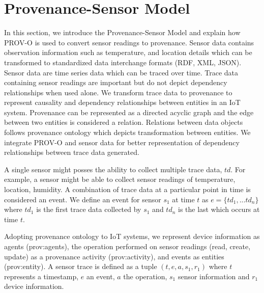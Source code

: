 \documentclass[conference]{IEEEtran}
\begin{document}



%



\section {Provenance-Sensor Model}
In this section, we introduce the Provenance-Sensor Model and explain how PROV-O is used to convert sensor readings to provenance. Sensor data contains observation information such as temperature, and location details which can be transformed to standardized data interchange formats (RDF, XML, JSON). Sensor data are time series data which can be traced over time. Trace data containing sensor readings are important but do not depict dependency relationships when used alone. We transform trace data to provenance to represent causality and dependency relationships between entities in an IoT system. Provenance can be represented as a directed acyclic graph and the edge between two entities is considered a relation. Relations between data objects follows provenance ontology which depicts transformation between entities. We integrate PROV-O and sensor data for better representation of dependency relationships between trace data generated.

\par A single sensor might posses the ability to collect multiple trace data, $td$. For example, a sensor might be able to collect sensor readings of temperature, location, humidity. A combination of trace data at a particular point in time is considered an event. We define an event  for sensor $s_1$ at time $t$ as $e= \{td_1, ...td_n\} $ where $td_1$ is the first trace data collected by $s_1$  and $td_n$ is the last which occurs at time $t$.





\par Adopting provenance ontology to IoT systems, we represent device information as agents (prov:agents), the operation performed on sensor readings (read, create, update) as a provenance activity (prov:activity), and events as entities (prov:entity). A sensor trace is defined as a tuple  $ (t, e, a, s_1, r_1)$ where $t$ represents a timestamp, $e$ an event, $a$ the operation, $s_1$ sensor information and $r_1$ device information.  
\end{document}
